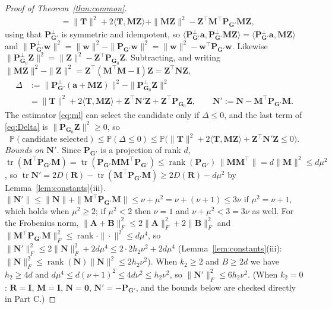 \documentclass[11pt]{article}
\theoremstyle{definition}
\newcommand{\bT}{\mathbf{T}}
\newcommand{\bZ}{\mathbf{Z}}
\newcommand{\bI}{\mathbf{I}}
\newcommand{\bR}{\mathbf{R}}
\newcommand{\bM}{\mathbf{M}}
\newcommand{\bN}{\mathbf{N}}
\newcommand{\bzero}{\mathbf{0}}
\newcommand{\Prob}{\mathbb{P}}
\newcommand{\tr}{\operatorname{tr}}
\begin{document}
\begin{proof}[Proof of Theorem~\ref{thm:common}]
\begin{align*}
&=\|\bT\|^2+2\langle\bT,\bM\bZ\rangle+\|\bM\bZ\|^2-\bZ^\top\bM^\top\mathbf P_{\mathbf G'}\bM\bZ,
\end{align*}
using that $\mathbf P^\perp_{\mathbf G'}$ is symmetric and idempotent, so $\langle\mathbf P^\perp_{\mathbf G'}\bm a,\mathbf P^\perp_{\mathbf G'}\bM\bZ\rangle=\langle\mathbf P^\perp_{\mathbf G'}\bm a,\bM\bZ\rangle$ and $\|\mathbf P^\perp_{\mathbf G'}\bm w\|^2=\|\bm w\|^2-\|\mathbf P_{\mathbf G'}\bm w\|^2=\|\bm w\|^2-\bm w^\top\mathbf P_{\mathbf G'}\bm w$. Likewise $\|\mathbf P^\perp_{\mathbf G_0}\bZ\|^2=\|\bZ\|^2-\bZ^\top\mathbf P_{\mathbf G_0}\bZ$. Subtracting, and writing $\|\bM\bZ\|^2-\|\bZ\|^2=\bZ^\top(\bM^\top\bM-\bI)\bZ=\bZ^\top\bN\bZ$,
\begin{equation}\label{eq:Delta}
\begin{aligned}
\Delta&:=\|\mathbf P^\perp_{\mathbf G'}(\bm a+\bM\bZ)\|^2-\|\mathbf P^\perp_{\mathbf G_0}\bZ\|^2\\
&=\|\bT\|^2+2\langle\bT,\bM\bZ\rangle+\bZ^\top\bN'\bZ+\bZ^\top\mathbf P_{\mathbf G_0}\bZ,\qquad\bN':=\bN-\bM^\top\mathbf P_{\mathbf G'}\bM .
\end{aligned}
\end{equation}
The estimator \eqref{eq:ml} can select the candidate only if $\Delta\le0$, and the last term of \eqref{eq:Delta} is $\|\mathbf P_{\mathbf G_0}\bZ\|^2\ge0$, so
\begin{equation}\label{eq:Delta-drop}
\Prob(\text{candidate selected})\le\Prob(\Delta\le0)\le\Prob\big(\|\bT\|^2+2\langle\bT,\bM\bZ\rangle+\bZ^\top\bN'\bZ\le0\big).
\end{equation}
\emph{Bounds on $\bN'$.} Since $\mathbf P_{\mathbf G'}$ is a projection of rank $d$, $\tr(\bM^\top\mathbf P_{\mathbf G'}\bM)=\tr(\mathbf P_{\mathbf G'}\bM\bM^\top\mathbf P_{\mathbf G'})\le\operatorname{rank}(\mathbf P_{\mathbf G'})\,\|\bM\bM^\top\|=d\|\bM\|^2\le d\mu^2$, so $\tr\bN'=2D(\bR)-\tr(\bM^\top\mathbf P_{\mathbf G'}\bM)\ge2D(\bR)-d\mu^2$ by Lemma~\ref{lem:constants}(iii). $\|\bN'\|\le\|\bN\|+\|\bM^\top\mathbf P_{\mathbf G'}\bM\|\le\nu+\mu^2=\nu+(\nu+1)\le3\nu$ if $\mu^2=\nu+1$, which holds when $\mu^2\ge2$; if $\mu^2<2$ then $\nu=1$ and $\nu+\mu^2<3=3\nu$ as well. For the Frobenius norm, $\|\mathbf A+\mathbf B\|_F^2\le2\|\mathbf A\|_F^2+2\|\mathbf B\|_F^2$ and $\|\bM^\top\mathbf P_{\mathbf G'}\bM\|_F^2\le\operatorname{rank}\cdot\|\cdot\|^2\le d\mu^4$, so $\|\bN'\|_F^2\le2\|\bN\|_F^2+2d\mu^4\le2\cdot2h_2\nu^2+2d\mu^4$ (Lemma~\ref{lem:constants}(iii): $\|\bN\|_F^2\le\operatorname{rank}(\bN)\|\bN\|^2\le2h_2\nu^2$). When $k_2\ge2$ and $B\ge2d$ we have $h_2\ge4d$ and $d\mu^4\le d(\nu+1)^2\le4d\nu^2\le h_2\nu^2$, so $\|\bN'\|_F^2\le6h_2\nu^2$. (When $k_2=0$: $\bR=\bI$, $\bM=\bI$, $\bN=\bzero$, $\bN'=-\mathbf P_{\mathbf G'}$, and the bounds below are checked directly in Part C.)


\end{proof}
\end{document}
